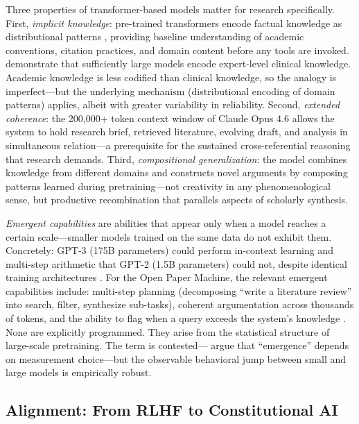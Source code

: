 \documentclass{article}
\begin{document}
Three properties of transformer-based models matter for research specifically. First, \textit{implicit knowledge}: pre-trained transformers encode factual knowledge as distributional patterns \citep{petroni2019language}, providing baseline understanding of academic conventions, citation practices, and domain content before any tools are invoked. \citet{singhal2023medpalm} demonstrate that sufficiently large models encode expert-level clinical knowledge. Academic knowledge is less codified than clinical knowledge, so the analogy is imperfect---but the underlying mechanism (distributional encoding of domain patterns) applies, albeit with greater variability in reliability. Second, \textit{extended coherence}: the 200,000+ token context window of Claude Opus 4.6 allows the system to hold research brief, retrieved literature, evolving draft, and analysis in simultaneous relation---a prerequisite for the sustained cross-referential reasoning that research demands. Third, \textit{compositional generalization}: the model combines knowledge from different domains and constructs novel arguments by composing patterns learned during pretraining---not creativity in any phenomenological sense, but productive recombination that parallels aspects of scholarly synthesis.

\textit{Emergent capabilities} are abilities that appear only when a model reaches a certain scale---smaller models trained on the same data do not exhibit them. Concretely: GPT-3 (175B parameters) could perform in-context learning and multi-step arithmetic that GPT-2 (1.5B parameters) could not, despite identical training architectures \citep{brown2020gpt3}. For the Open Paper Machine, the relevant emergent capabilities include: multi-step planning (decomposing ``write a literature review'' into search, filter, synthesize sub-tasks), coherent argumentation across thousands of tokens, and the ability to flag when a query exceeds the system's knowledge \citep{kalyan2024gpt3}. None are explicitly programmed. They arise from the statistical structure of large-scale pretraining. The term is contested---\citet{schaeffer2024emergent} argue that ``emergence'' depends on measurement choice---but the observable behavioral jump between small and large models is empirically robust.


\subsection{Alignment: From RLHF to Constitutional AI}
\end{document}
